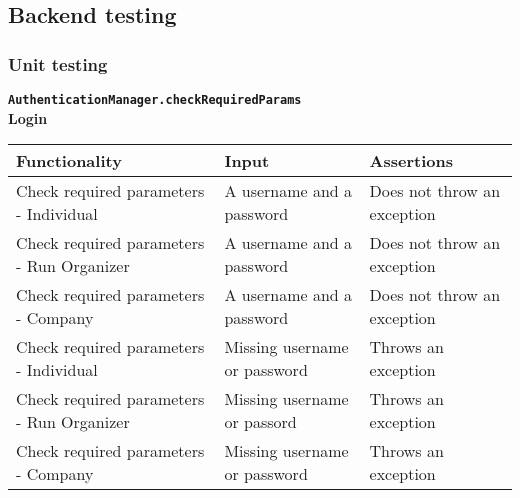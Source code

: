 \subsection{Backend testing}
\subsubsection{Unit testing}

\noindent\textbf{\texttt{AuthenticationManager.checkRequiredParams}}  \\
\textbf{Login}
\begin{longtable}{|p{}|p{}|p{}|}
    \hline
    \textbf{Functionality} & \textbf{Input} & \textbf{Assertions} \\
    \hline
    Check required parameters - Individual & A username and a password &  Does not throw an exception \\
    \hline
    Check required parameters - Run Organizer & A username and a password & Does not throw an exception \\
    \hline
    Check required parameters - Company & A username and a password & Does not throw an exception \\
    \hline
    
    Check required parameters - Individual & Missing username or password &  Throws an exception \\
    \hline
    Check required parameters - Run Organizer & Missing username or passord & Throws an exception \\
    \hline
    Check required parameters - Company & Missing username or password & Throws an exception \\
    \hline
\end{longtable}

